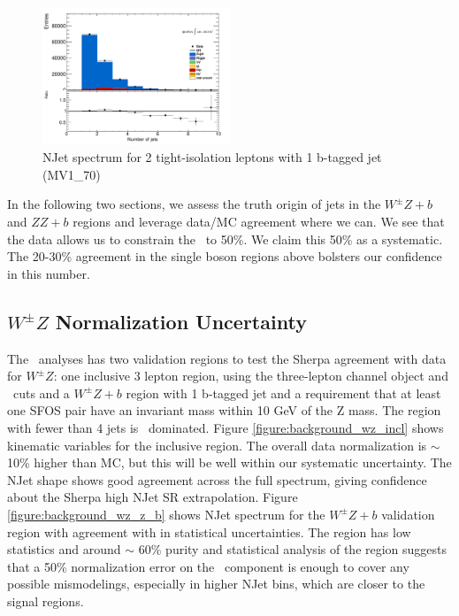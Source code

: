 \begin{figure}[!htbp]
\centering \includegraphics[width=0.5\textwidth]{figs/wz/ZbVR}
\caption{NJet spectrum for 2 tight-isolation leptons with 1 b-tagged jet (MV1\_70)} 
\label{figure:background_wz_zb}
\end{figure} 

In the following two sections, we assess the truth origin of jets in the $W^{\pm}Z+b$ and $ZZ+b$ regions and leverage data/MC agreement where we can. We see that the data allows us to constrain the \WZ\ to 50\%. We claim this 50\% as a systematic. The 20-30\% agreement in the single boson regions above bolsters our confidence in this number. 

\subsection{$W^{\pm}Z$ Normalization Uncertainty} 
The \tth\ analyses has two validation regions to test the Sherpa agreement with data for $W^{\pm}Z$: one inclusive 3 lepton region, using the three-lepton channel object and \pt\ cuts and a $W^{\pm}Z+b$ region with 1 b-tagged jet and a requirement that at least one SFOS pair have an invariant mass within 10 GeV of the Z mass. The region with fewer than 4 jets is \WZ\ dominated. Figure \ref{figure:background_wz_incl} shows kinematic variables for the inclusive region. The overall data normalization is $\sim$10\% higher than MC, but this will be well within our systematic uncertainty. The NJet shape shows good agreement across the full spectrum, giving confidence about the Sherpa high NJet SR extrapolation. Figure \ref{figure:background_wz_z_b} shows NJet spectrum for the $W^{\pm}Z+b$ validation region with agreement with in statistical uncertainties. The region has low statistics and around $\sim$ 60\% purity and statistical analysis of the region suggests that a 50\% normalization error on the \WZ\ component is enough to cover any possible mismodelings, especially in higher NJet bins, which are closer to the signal regions.  

